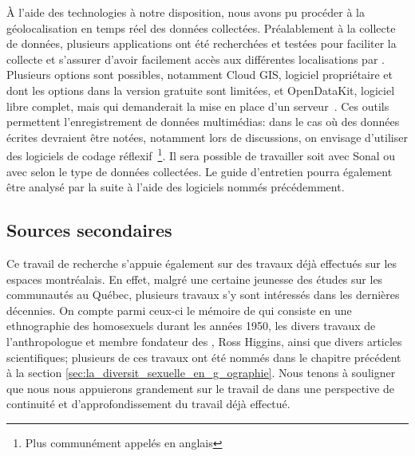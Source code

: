 À l'aide des technologies à notre disposition, nous avons pu procéder à la géolocalisation en temps réel des données collectées. 
Préalablement à la collecte de données, plusieurs applications ont été recherchées et testées pour faciliter la collecte et s'assurer d'avoir facilement accès aux différentes localisations par \gps. 
Plusieurs options sont possibles, notamment Cloud GIS, logiciel propriétaire et dont les options dans la version gratuite sont limitées, et OpenDataKit, logiciel libre complet, mais qui demanderait la mise en place d'un serveur~\citep{OpenDataKit2014}. 
Ces outils permettent l'enregistrement de données multimédias: dans le cas où des données écrites devraient être notées, notamment lors de discussions, on envisage d'utiliser des logiciels de codage réflexif~\footnote{Plus communément appelés en anglais   \cadqas}. 
Il sera possible de travailler soit avec Sonal ou avec \rqda{} selon le type de données collectées. 
Le guide d'entretien pourra également être analysé par la suite à l'aide des logiciels nommés précédemment.

\subsection{Sources secondaires}
\label{sub:sources_secondaires}
Ce travail de recherche s'appuie également sur des travaux déjà effectués sur les espaces \qus{} montréalais. 
En effet, malgré une certaine jeunesse des études sur les communautés \lgbt{} au Québec, plusieurs travaux s'y sont intéressés dans les dernières décennies. 
On compte parmi ceux-ci le mémoire de \cite{Leznoff1954} qui consiste en une ethnographie des homosexuels durant les années 1950, les divers travaux de l'anthropologue et membre fondateur des \agq{}, Ross Higgins, ainsi que divers articles scientifiques; plusieurs de ces travaux ont été nommés dans le chapitre précédent à la section \ref{sec:la_diversit_sexuelle_en_g_ographie}. 
Nous tenons à souligner que nous nous appuierons grandement sur le travail de \citep{Giraud2014} dans une perspective de continuité et d'approfondissement du travail déjà effectué.

